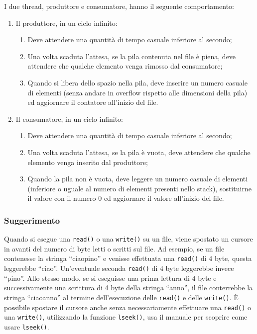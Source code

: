 \documentclass{article}
\numberwithin{equation}{subsection}
\begin{document}
I due thread, produttore e consumatore, hanno il seguente comportamento:
\begin{enumerate}
    \item Il produttore, in un ciclo infinito:
    \begin{enumerate}
        \item Deve attendere una quantità di tempo casuale inferiore al secondo;
        \item Una volta scaduta l'attesa, se la pila contenuta nel file è piena, deve attendere che qualche elemento venga rimosso dal consumatore;
        \item Quando si libera dello spazio nella pila, deve inserire un numero casuale di elementi (senza andare in overflow rispetto alle dimensioni della pila) ed aggiornare il contatore all'inizio del file.
    \end{enumerate}
    \item Il consumatore, in un ciclo infinito:
    \begin{enumerate}
        \item Deve attendere una quantità di tempo casuale inferiore al secondo;
        \item Una volta scaduta l'attesa, se la pila è vuota, deve attendere che qualche elemento venga inserito dal produttore;
        \item Quando la pila non è vuota, deve leggere un numero casuale di elementi (inferiore o uguale al numero di elementi presenti nello stack), sostituirne il valore con il numero 0 ed aggiornare il valore all'inizio del file.
    \end{enumerate}
\end{enumerate}

\subsubsection*{Suggerimento}

Quando si esegue una \verb|read()| o una \verb|write()| su un file, viene spostato un cursore in avanti del numero di byte letti o scritti sul file. Ad esempio, se un file contenesse la stringa ``ciaopino'' e venisse effettuata una \verb|read()| di 4 byte, questa leggerebbe ``ciao''. Un'eventuale seconda \verb|read()| di 4 byte leggerebbe invece ``pino''. Allo stesso modo, se si eseguisse una prima lettura di 4 byte e successivamente una scrittura di 4 byte della stringa ``anno'', il file conterrebbe la stringa ``ciaoanno'' al termine dell'esecuzione delle \verb|read()| e delle \verb|write()|.
\`{E} possibile spostare il cursore anche senza necessariamente effettuare una \verb|read()| o una \verb|write()|, utilizzando la funzione \verb|lseek()|, usa il manuale per scoprire come usare \verb|lseek()|.
\end{document}
